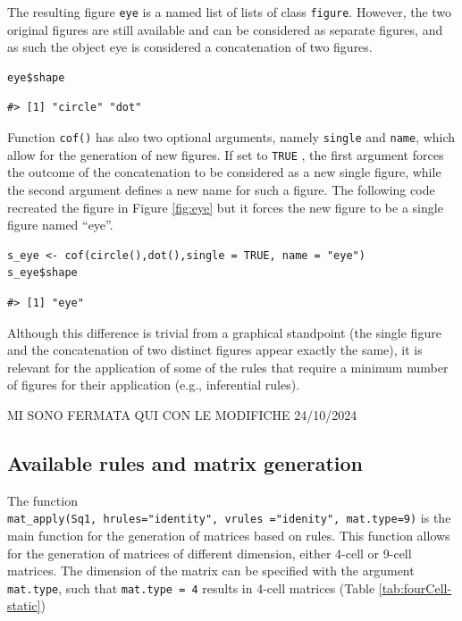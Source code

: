 The resulting figure \texttt{eye} is a named list of lists of class \texttt{figure}.
However, the two original figures are still available and can be considered as separate figures, and as such the object eye is considered a concatenation of two figures.

\begin{verbatim}
eye$shape
\end{verbatim}

\begin{verbatim}
#> [1] "circle" "dot"
\end{verbatim}

Function \texttt{cof()} has also two optional arguments, namely \texttt{single} and \texttt{name}, which allow for the generation of new figures.
If set to \texttt{TRUE} , the first argument forces the outcome of the concatenation to be considered as a new single figure, while the second argument defines a new name for such a figure.
The following code recreated the figure in Figure \ref{fig:eye} but it forces the new figure to be a single figure named ``eye''.

\begin{verbatim}
s_eye <- cof(circle(),dot(),single = TRUE, name = "eye")
s_eye$shape
\end{verbatim}

\begin{verbatim}
#> [1] "eye"
\end{verbatim}

Although this difference is trivial from a graphical standpoint (the single figure and the concatenation of two distinct figures appear exactly the same), it is relevant for the application of some of the rules that require a minimum number of figures for their application (e.g., inferential rules).

MI SONO FERMATA QUI CON LE MODIFICHE 24/10/2024

\subsection{Available rules and matrix generation}\label{available-rules-and-matrix-generation}

The function \texttt{mat\_apply(Sq1,\ hrules="identity",\ vrules\ ="idenity",\ mat.type=9)} is the main function for the generation of matrices based on rules.
This function allows for the generation of matrices of different dimension, either 4-cell or 9-cell matrices.
The dimension of the matrix can be specified with the argument \texttt{mat.type}, such that \texttt{mat.type\ =\ 4} results in 4-cell matrices (Table \ref{tab:fourCell-static})

